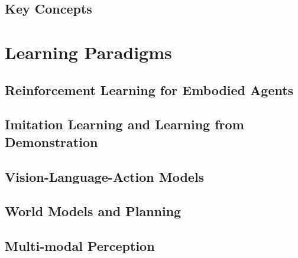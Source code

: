 \documentclass[12pt, a4paper]{article}
\begin{document}
\subsection{Key Concepts}

\section{Learning Paradigms}
\label{sec:methods}

\subsection{Reinforcement Learning for Embodied Agents}

\subsection{Imitation Learning and Learning from Demonstration}

\subsection{Vision-Language-Action Models}

\subsection{World Models and Planning}

\subsection{Multi-modal Perception}

\end{document}
